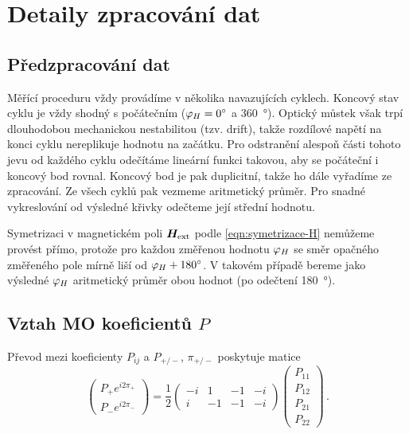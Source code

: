 \section{Detaily zpracování dat}
\label{app:zpracovani}

\subsection*{Předzpracování dat}

Měřící proceduru vždy provádíme v několika navazujících cyklech.
Koncový stav cyklu je vždy shodný s počátečním ($\varphi_H=\SI{0}{\degree}$ a \SI{360}{\degree}).
Optický můstek však trpí dlouhodobou mechanickou nestabilitou (tzv. drift), takže rozdílové napětí na konci cyklu nereplikuje hodnotu na začátku.
Pro odstranění alespoň části tohoto jevu od každého cyklu odečítáme lineární funkci takovou, aby se počáteční i koncový bod rovnal.
Koncový bod je pak duplicitní, takže ho dále vyřadíme ze zpracování.
Ze všech cyklů pak vezmeme aritmetický průměr.
Pro snadné vykreslování od výsledné křivky odečteme její střední hodnotu.

Symetrizaci v magnetickém poli $\bm{H}_\textrm{ext}$ podle \eqref{eqn:symetrizace-H} nemůžeme provést přímo, protože pro každou změřenou hodnotu $\varphi_H$ se směr opačného změřeného pole mírně liší od $\varphi_H+\SI{180}{\degree}$.
V takovém případě bereme jako výsledné $\varphi_H$ aritmetický průměr obou hodnot (po odečtení \SI{180}{\degree}).

\subsection*{Vztah MO koeficientů $P$}

Převod mezi koeficienty $P_{ij}$ a $P_{+/-}$, $\pi_{+/-}$ poskytuje matice
\begin{equation}
    \begin{pmatrix} P_+ e^{i2\pi_+} \\ P_- e^{i2\pi_-} \end{pmatrix}
    = \frac{1}{2}
    \begin{pmatrix} -i & 1 & -1 & -i \\ i & -1 & -1 & -i \end{pmatrix}
    \begin{pmatrix} P_{11}\\P_{12}\\P_{21}\\P_{22} \end{pmatrix}  \,.
\end{equation}


